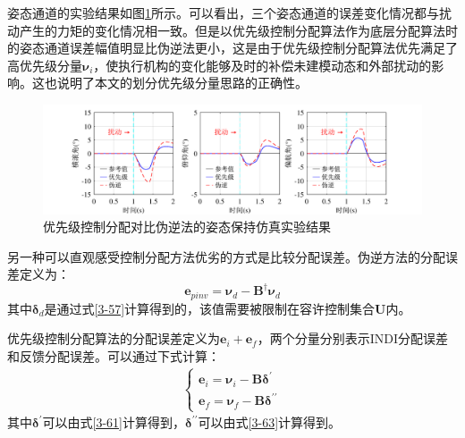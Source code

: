 姿态通道的实验结果如图\ref{优先级伪逆姿态仿真}所示。可以看出，三个姿态通道的误差变化情况都与扰动产生的力矩的变化情况相一致。但是以优先级控制分配算法作为底层分配算法时的姿态通道误差幅值明显比伪逆法更小，这是由于优先级控制分配算法优先满足了高优先级分量$\boldsymbol{\nu}_i$，使执行机构的变化能够及时的补偿未建模动态和外部扰动的影响。这也说明了本文的划分优先级分量思路的正确性。
\begin{figure}[htbp]
	\centering
	\begin{minipage}[c]{1\textwidth}
        \centering
        \includegraphics[scale=1]{Fig/优先级对比伪逆的姿态保持仿真实验结果.pdf}
        \caption{\label{优先级伪逆姿态仿真}优先级控制分配对比伪逆法的姿态保持仿真实验结果}
        \end{minipage}
\end{figure}

另一种可以直观感受控制分配方法优劣的方式是比较分配误差。伪逆方法的分配误差定义为：
\begin{equation}
    \boldsymbol{e}_{pinv}=\boldsymbol{\nu}_d-\boldsymbol{B}^{\dagger}\boldsymbol{\nu}_d
    \label{3-66}
\end{equation}
其中$\boldsymbol{\delta}_d$是通过式\eqref{3-57}计算得到的，该值需要被限制在容许控制集合$\boldsymbol{U}$内。

优先级控制分配算法的分配误差定义为$\boldsymbol{e}_{i}+\boldsymbol{e}_{f}$，两个分量分别表示INDI分配误差和反馈分配误差。可以通过下式计算：
\begin{equation}
    \begin{gathered}
        \begin{cases}
            \boldsymbol{e}_{i}=\boldsymbol{\nu}_i-\boldsymbol{B}\boldsymbol{\delta}^{\prime} \\
            \boldsymbol{e}_{f}=\boldsymbol{\nu}_f-\boldsymbol{B}\boldsymbol{\delta}^{\prime\prime}
        \end{cases}
    \end{gathered}
    \label{3-67}
\end{equation}
其中$\boldsymbol{\delta}^{\prime}$可以由式\eqref{3-61}计算得到，$\boldsymbol{\delta}^{\prime\prime}$可以由式\eqref{3-63}计算得到。

